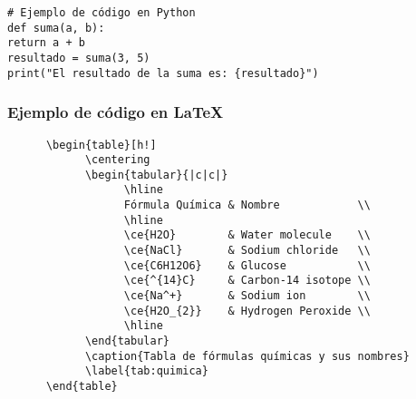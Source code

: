 \documentclass[11pt]{article}
\numberwithin{equation}{section} %
\theoremstyle{plain}                            %
\theoremstyle{definition}                       %
\theoremstyle{remark}                           %
\begin{document}
\begin{verbatim}
# Ejemplo de código en Python
def suma(a, b):
return a + b
resultado = suma(3, 5)
print("El resultado de la suma es: {resultado}")
\end{verbatim}

\subsubsection{Ejemplo de código en \LaTeX{}}

\begin{verbatim}
      \begin{table}[h!]
            \centering
            \begin{tabular}{|c|c|}
                  \hline
                  Fórmula Química & Nombre            \\
                  \hline
                  \ce{H2O}        & Water molecule    \\
                  \ce{NaCl}       & Sodium chloride   \\
                  \ce{C6H12O6}    & Glucose           \\
                  \ce{^{14}C}     & Carbon-14 isotope \\
                  \ce{Na^+}       & Sodium ion        \\
                  \ce{H2O_{2}}    & Hydrogen Peroxide \\
                  \hline
            \end{tabular}
            \caption{Tabla de fórmulas químicas y sus nombres}
            \label{tab:quimica}
      \end{table}      
\end{verbatim}
\end{document}
